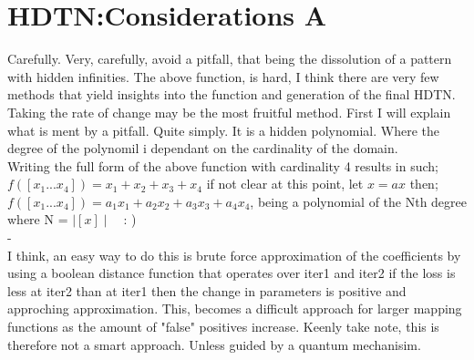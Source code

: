 \documentclass{article}
\begin{document}
\section{HDTN:Considerations A}
Carefully. Very, carefully, avoid a pitfall, that being the dissolution of a pattern with hidden infinities.
The above function, is hard, I think there are very few methods that yield insights into the function and 
generation of the final HDTN. Taking the rate of change may be the most fruitful method. First I will explain
what is ment by a pitfall. Quite simply. It is a hidden polynomial. Where the degree of the polynomil i
dependant on the cardinality of the domain.\\ Writing the full form of the above function with cardinality
4 results in such;\\ $f([x_1...x_4])=x_1+x_2+x_3+x_4$ if not clear at this point, let $x = ax$ then;\\
$f([x_1...x_4])=a_1x_1+a_2x_2+a_3x_3+a_4x_4$, being a polynomial of the Nth degree where N = $\mid[x]\mid$\ \ : )\\
{\color{white}-}\\
I think, an easy way to do this is brute force approximation of the coefficients by using a boolean
distance function that operates over iter1 and iter2 if the loss is less at iter2 than at iter1 then 
the change in parameters is positive and approching approximation. This, becomes a difficult approach for larger
mapping functions as the amount of "false" positives increase. Keenly take note, this is therefore not a smart
approach. Unless guided by a quantum mechanisim.\\
\end{document}
